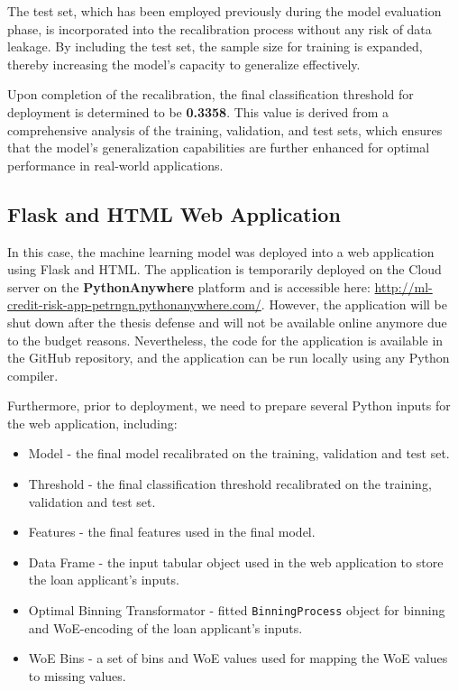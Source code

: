 The test set, which has been employed previously during the model evaluation phase, is incorporated into the recalibration process without any risk of data leakage.
By including the test set, the sample size for training is expanded, thereby increasing the model's capacity to generalize effectively.

Upon completion of the recalibration, the final classification threshold for deployment is determined to be \textbf{0.3358}.
This value is derived from a comprehensive analysis of the training, validation, and test sets, which ensures that the model's generalization capabilities are further enhanced for optimal performance in real-world applications.

\subsection{Flask and HTML Web Application}

In this case, the machine learning model was deployed into a web application using Flask and HTML. The application is temporarily deployed on the Cloud server on the \textbf{PythonAnywhere} platform and is accessible here: \url{http://ml-credit-risk-app-petrngn.pythonanywhere.com/}.
However, the application will be shut down after the thesis defense and will not be available online anymore due to the budget reasons.
Nevertheless, the code for the application is available in the GitHub repository, and the application can be run locally using any Python compiler.

Furthermore, prior to deployment, we need to prepare several Python inputs for the web application, including:
\begin{itemize}\setlength\itemsep{0em}
\item Model - the final model recalibrated on the training, validation and test set.
\item Threshold - the final classification threshold recalibrated on the training, validation and test set.
\item Features - the final features used in the final model.
\item Data Frame - the input tabular object used in the web application to store the loan applicant's inputs.
\item Optimal Binning Transformator - fitted \lstinline{BinningProcess} object for binning and WoE-encoding of the loan applicant's inputs.
\item WoE Bins - a set of bins and WoE values used for mapping the WoE values to missing values.
\end{itemize}

